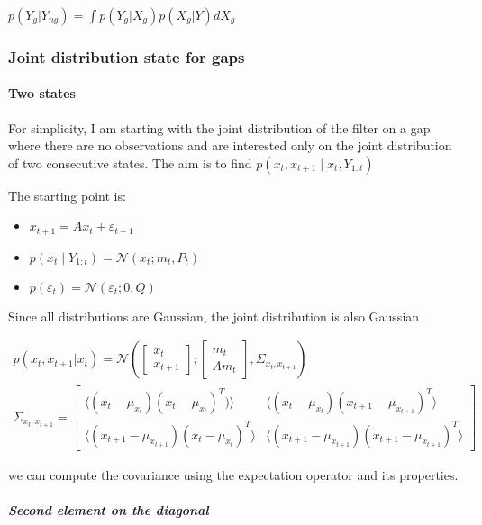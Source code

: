 \documentclass{article}
\newcommand{\E}[1]{\langle #1 \rangle} %
\newcommand{\norm}[3]{\mathcal{N}\left(#1; #2, #3\right)}
\begin{document}
$p(Y_g|Y_{ng}) = \int p(Y_g|X_g)p(X_g|Y)dX_g$


\subsubsection{Joint distribution state for gaps}

\paragraph{Two states}

For simplicity, I am starting with the joint distribution of the filter on a gap where there are no observations and are interested only on the joint distribution of two consecutive states.
The aim is to find $p(x_t, x_{t+1}\mid x_t, Y_{1:t})$

The starting point is:
\begin{itemize}
    \item $x_{t+1} = Ax_{t} + \varepsilon_{t+1}$
    \item $p(x_t \mid Y_{1:t}) = \norm{x_t}{m_t}{P_t}$
    \item $p(\varepsilon_t) = \norm{\varepsilon_t}{0}{Q}$
\end{itemize}

Since all distributions are Gaussian, the joint distribution is also Gaussian


\begin{multline}\label{p_X2_start}
p(x_t, x_{t+1}|x_t) = \norm{\begin{bmatrix}x_t\\x_{t+1}\end{bmatrix}}{\begin{bmatrix}m_t\\Am_t\end{bmatrix}}{\Sigma_{x_t, x_{t+1}}} \\
\Sigma_{x_t, x_{t+1}} = \begin{bmatrix}\E{(x_t-\mu_{x_t})(x_t-\mu_{x_t})^T)}&\E{(x_t-\mu_{x_t})(x_{t+1}-\mu_{x_{t+1}})^T}\\\E{(x_{t+1}-\mu_{x_{t+1}})(x_{t}-\mu_{x_{t}})^T}&\E{(x_{t+1}-\mu_{x_{t+1}})(x_{t+1}-\mu_{x_{t+1}})^T}\end{bmatrix}
\end{multline}

we can compute the covariance using the expectation operator and its properties.

\subparagraph{Second element on the diagonal}
\end{document}
